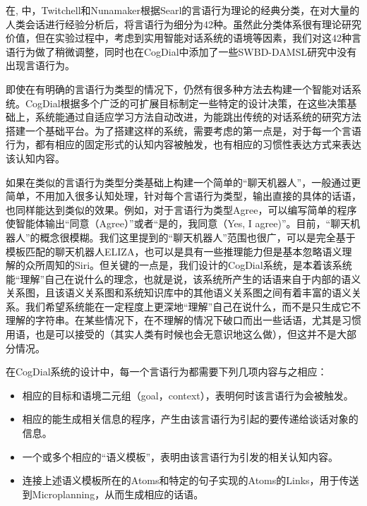 在\cite{Twitchell2004}, 中，Twitchell和Nunamaker根据Searl的言语行为理论的经典分类，在对大量的人类会话进行经验分析后，将言语行为细分为42种。虽然此分类体系很有理论研究价值，但在实验过程中，考虑到实用智能对话系统的语境等因素，我们对这42种言语行为做了稍微调整，同时也在CogDial中添加了一些SWBD-DAMSL研究中没有出现言语行为。

即使在有明确的言语行为类型的情况下，仍然有很多种方法去构建一个智能对话系统。CogDial根据多个广泛的可扩展目标制定一些特定的设计决策，在这些决策基础上，系统能通过自适应学习方法自动改进，为能跳出传统的对话系统的研究方法搭建一个基础平台。为了搭建这样的系统，需要考虑的第一点是，对于每一个言语行为，都有相应的固定形式的认知内容被触发，也有相应的习惯性表达方式来表达该认知内容。

如果在类似的言语行为类型分类基础上构建一个简单的“聊天机器人”，一般通过更简单，不用加入很多认知处理，针对每个言语行为类型，输出直接的具体的话语，也同样能达到类似的效果。例如，对于言语行为类型Agree，可以编写简单的程序使智能体输出“同意（Agree）”或者“是的，我同意（Yes, I agree)”。目前，“聊天机器人”的概念很模糊。我们这里提到的“聊天机器人”范围也很广，可以是完全基于模板匹配的聊天机器人ELIZA\cite{Weizenbaum1966}，也可以是具有一些推理能力但是基本忽略语义理解的众所周知的Siri。但关键的一点是，我们设计的CogDial系统，是本着该系统能“理解”自己在说什么的理念，也就是说，该系统所产生的话语来自于内部的语义关系图，且该语义关系图和系统知识库中的其他语义关系图之间有着丰富的语义关系。我们希望系统能在一定程度上更深地“理解”自己在说什么，而不是只生成它不理解的字符串。在某些情况下，在不理解的情况下破口而出一些话语，尤其是习惯用语，也是可以接受的（其实人类有时候也会无意识地这么做），但这并不是大部分情况。

在CogDial系统的设计中，每一个言语行为都需要下列几项内容与之相应：
\begin{itemize}
\item 相应的目标和语境二元组（goal，context），表明何时该言语行为会被触发。
\item 相应的能生成相关信息的程序，产生由该言语行为引起的要传递给谈话对象的信息。
\item 一个或多个相应的“语义模板”，表明由该言语行为引发的相关认知内容。
\item 连接上述语义模板所在的Atoms和特定的句子实现的Atoms的Links，用于传送到Microplanning，从而生成相应的话语。
\end{itemize}

